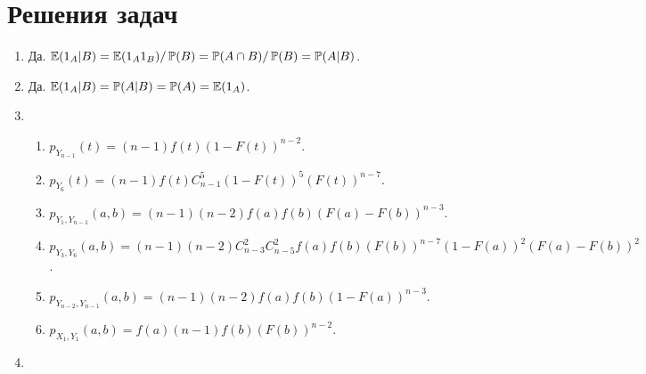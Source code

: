 \section{Решения задач}
\begin{enumerate}

\item Да. $ \operatorname{\mathbb{E}}(1_{A}|B)=\operatorname{\mathbb{E}}(1_{A}1_{B})/\operatorname{\mathbb{P}}(B)=\operatorname{\mathbb{P}}(A\cap B)/\operatorname{\mathbb{P}}(B)=\operatorname{\mathbb{P}}(A|B) $.

\item Да. $ \operatorname{\mathbb{E}}(1_{A}|B)=\operatorname{\mathbb{P}}(A|B)=\operatorname{\mathbb{P}}(A)=\operatorname{\mathbb{E}}(1_{A})$.

\item
\begin{enumerate}
\item $ p_{Y_{n-1}}(t)=(n-1)f(t)(1-F(t))^{n-2} $.
\item $ p_{Y_{6}}(t)=(n-1)f(t)C^{5}_{n-1}(1-F(t))^{5}(F(t))^{n-7} $.
\item $ p_{Y_{1},Y_{n-1}}(a,b)=(n-1)(n-2)f(a)f(b)(F(a)-F(b))^{n-3} $.
\item $ p_{Y_{3},Y_{6}}(a,b)=(n-1)(n-2)C_{n-3}^{2}C_{n-5}^{2}f(a)f(b) (F(b))^{n-7}(1-F(a))^{2}(F(a)-F(b))^{2} $.
\item $ p_{Y_{n-2},Y_{n-1}}(a,b)=(n-1)(n-2)f(a)f(b)(1-F(a))^{n-3} $.
\item $ p_{X_{1},Y_{1}}(a,b)=f(a)(n-1)f(b)(F(b))^{n-2} $.
\end{enumerate}


\item


\end{enumerate}
